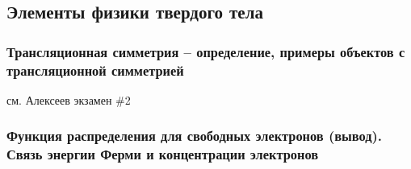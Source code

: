 \subsection{Элементы физики твердого тела}

\subsubsection{Трансляционная симметрия --  определение, примеры объектов с трансляционной симметрией}

см. Алексеев экзамен \#2

\subsubsection{Функция распределения для свободных электронов (вывод). Связь энергии Ферми и концентрации электронов}
\label{sec:free-elecs}

